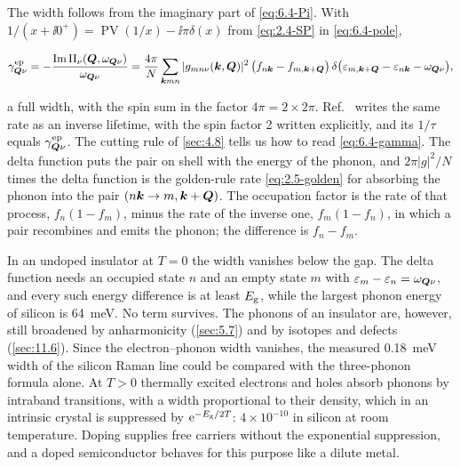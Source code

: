 The width follows from the imaginary part of \cref{eq:6.4-Pi}. With $1/(x + \ii0^+) = \operatorname{PV}(1/x) - \ii\pi\delta(x)$ from \cref{eq:2.4-SP} in \cref{eq:6.4-pole},
\begin{keyresult}
\begin{equation}
  \gamma^{\mathrm{ep}}_{\bm{Q}\nu} = -\frac{\operatorname{Im}\Pi_\nu(\bm{Q},\omega_{\bm{Q}\nu})}{\omega_{\bm{Q}\nu}}
  = \frac{4\pi}{N}\sum_{\bm{k}mn}|g_{mn\nu}(\bm{k},\bm{Q})|^2\,\bigl(f_{n\bm{k}} - f_{m,\bm{k}+\bm{Q}}\bigr)\,\delta\bigl(\varepsilon_{m,\bm{k}+\bm{Q}} - \varepsilon_{n\bm{k}} - \omega_{\bm{Q}\nu}\bigr) ,
  \label{eq:6.4-gamma}
\end{equation}
\end{keyresult}
a full width, with the spin sum in the factor $4\pi = 2\times2\pi$. Ref.~\cite[Eq.~(146)]{giustino2017electron} writes the same rate as an inverse lifetime, with the spin factor 2 written explicitly, and its $1/\tau$ equals $\gamma^{\mathrm{ep}}_{\bm{Q}\nu}$. The cutting rule of \cref{sec:4.8} tells us how to read \cref{eq:6.4-gamma}. The delta function puts the pair on shell with the energy of the phonon, and $2\pi|g|^2/N$ times the delta function is the golden-rule rate \cref{eq:2.5-golden} for absorbing the phonon into the pair $(n\bm{k} \to m,\bm{k}+\bm{Q})$. The occupation factor is the rate of that process, $f_n(1 - f_m)$, minus the rate of the inverse one, $f_m(1 - f_n)$, in which a pair recombines and emits the phonon; the difference is $f_n - f_m$.

In an undoped insulator at $T = 0$ the width vanishes below the gap. The delta function needs an occupied state $n$ and an empty state $m$ with $\varepsilon_m - \varepsilon_n = \omega_{\bm{Q}\nu}$, and every such energy difference is at least $E_{\mathrm{g}}$, while the largest phonon energy of silicon is \SI{64}{meV}. No term survives. The phonons of an insulator are, however, still broadened by anharmonicity (\cref{sec:5.7}) and by isotopes and defects (\cref{sec:11.6}). Since the electron--phonon width vanishes, the measured \SI{0.18}{meV} width of the silicon Raman line could be compared with the three-phonon formula alone. At $T > 0$ thermally excited electrons and holes absorb phonons by intraband transitions, with a width proportional to their density, which in an intrinsic crystal is suppressed by $\mathrm{e}^{-E_{\mathrm{g}}/2T}$: $4\times10^{-10}$ in silicon at room temperature. Doping supplies free carriers without the exponential suppression, and a doped semiconductor behaves for this purpose like a dilute metal.

